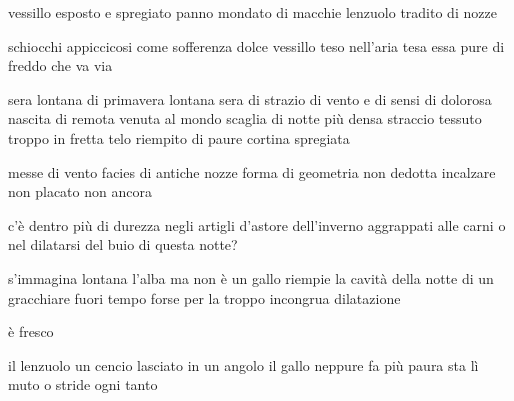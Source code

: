 \begin{poem}
	\begin{stanza}
		vessillo esposto e spregiato\verseline
		panno mondato di macchie\verseline
		lenzuolo tradito di nozze
	\end{stanza}

	\begin{stanza}
		schiocchi appiccicosi\verseline
		come sofferenza dolce\verseline
		vessillo teso nell'aria\verseline
		tesa essa pure di freddo\verseline
		che va via
	\end{stanza}

	\begin{stanza}
		sera lontana di primavera\verseline
		lontana sera di strazio\verseline
		di vento e di sensi\verseline
		di dolorosa nascita\verseline
		di remota venuta al mondo\verseline
		scaglia di notte più densa\verseline
		straccio tessuto troppo in fretta\verseline
		telo riempito di paure\verseline
		cortina spregiata
	\end{stanza}

	\begin{stanza}
		messe di vento\verseline
		facies di antiche nozze\verseline
		forma di geometria non dedotta\verseline
		incalzare non placato\verseline
		non ancora
	\end{stanza}
\end{poem}

\clearpage


\begin{poem}
	\begin{stanza}
		c’è dentro più di durezza\verseline
		negli artigli d'astore dell'inverno\verseline
		aggrappati alle carni\verseline
		o nel dilatarsi del buio\verseline
		di questa notte?
	\end{stanza}

	\begin{stanza}
		s'immagina lontana l'alba\verseline
		ma non è\verseline
		un gallo riempie la cavità della notte\verseline
		di un gracchiare fuori tempo\verseline
		forse per la troppo incongrua\verseline
		dilatazione
	\end{stanza}

	\begin{stanza}
		è fresco
	\end{stanza}

	\begin{stanza}
		il lenzuolo un cencio lasciato in un angolo\verseline
		il gallo neppure fa più paura\verseline
		sta lì muto o stride ogni tanto
	\end{stanza}
\end{poem}
